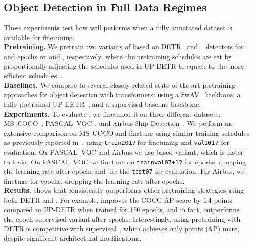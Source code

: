 \subsection{Object Detection in Full Data Regimes}
\label{subsec:fulldata}
These experiments test how well \model performs when a fully annotated dataset is available for finetuning.
\vspace{0.1cm}
\\
\noindent\textbf{Pretraining.} We pretrain two variants of \model based on DETR~\cite{carion2020end} and ~\cite{zhu2020deformable} detectors for  and  epochs on \imagenetthousand and \imagenethundred, respectively, where the pretraining schedules are set by proportionally adjusting the schedules used in UP-DETR to equate to the more efficient  schedules~\cite{zhu2020deformable}.
\vspace{0.1cm}
\\
\noindent\textbf{Baselines.} We compare \model to several closely related state-of-the-art pretraining approaches for object detection with transformers: using a SwAV~\cite{caron2020unsupervised} backbone, a fully pretrained UP-DETR~\cite{dai2020up}, and a supervised baseline backbone.
\vspace{0.1cm}
\\
\noindent\textbf{Experiments.} To evaluate \model, we finetuned it on three different datasets: MS~COCO~\cite{lin2014microsoft}, PASCAL~VOC~\cite{everingham2010pascal}, and Airbus Ship Detection~\cite{airbus}. We perform an extensive comparison on MS~COCO and finetune using similar training schedules as previously reported in~\cite{dai2020up, zhu2020deformable}, using \texttt{train2017} for finetuning and \texttt{val2017} for evaluation. On PASCAL~VOC and Airbus we use \model {} based variant, which is faster to train. On PASCAL~VOC we finetune on \texttt{trainval07+12} for  epochs, dropping the learning rate after  epochs and use the \texttt{test07} for evaluation. For Airbus, we finetune for  epochs, dropping the learning rate after  epochs. 
\vspace{0.1cm}
\\
\noindent\textbf{Results.}  shows that \model consistently outperforms other pretraining strategies using both DETR and . For example, \model improves the COCO AP score by 1.4 points compared to UP-DETR when trained for 150 epochs, and in fact, outperforms the  epoch supervised variant after  epochs. Interestingly, using \model pretraining with DETR is competitive with supervised , which achieves only  points (AP) more, despite significant architectural modifications.

